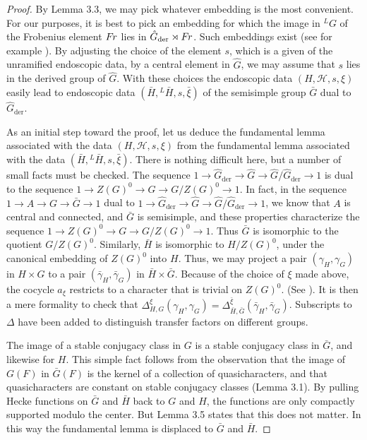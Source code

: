 \documentclass{amsart}
\newcommand\Fr{\text{$F\hskip-.1em r$}}
\newcommand\der{{\text{der}}}
\begin{document}
\begin{proof}
By Lemma 3.3, we may pick whatever embedding is the most
convenient.  For our purposes, it is best to pick an embedding
for which the image in ${}^L\!G$ of the Frobenius element $\Fr$
lies in $\hat G_\der\rtimes\Fr$.  Such embeddings
exist (see for example \cite{H2,6.1}).  By adjusting the
choice of the element $s$, which is
a given of the unramified endoscopic data, 
by a central element in $\hat G$,
we may assume that $s$ lies in the derived group of $\hat G$.
With these choices the endoscopic data $(H,{\mathcal H},s,\xi)$ easily
lead to endoscopic data $(\bar H,{}^L\!\bar H,s,\bar\xi)$
of the semisimple group $\bar G$ dual to $\hat G_\der$.

As an initial step toward the proof, let us deduce the fundamental
lemma associated with the data  $(H,{\mathcal H},s,\xi)$
from the fundamental lemma associated with the data
$(\bar H,{}^L\!\bar H,s,\bar\xi)$.
There is nothing difficult here, but a number of small facts
must be checked.  The sequence $1\to \hat G_\der\to\hat G
\to \hat G/\hat G_\der\to 1$ is dual to the sequence
$1\to Z(G)^0 \to G \to G/Z(G)^0\to 1$.  In fact, in the
sequence $1\to A\to G\to \bar G\to 1$ dual to 
$1\to  \hat G_\der\to\hat G\to\hat G/\hat G_\der\to 1$,
we know that 
$A$ is central and connected, and $\bar G$ is semisimple, and these properties
characterize the sequence $1\to Z(G)^0 \to G \to G/Z(G)^0\to 1$.
Thus $\bar G$ is isomorphic to the quotient $G/Z(G)^0$.
Similarly, $\bar H$ is isomorphic to $H/Z(G)^0$, under the canonical
embedding of $Z(G)^0$ into $H$.  Thus, we may project a pair $(\gamma_H,\gamma_G)$
in $H\times G$ to a pair $(\bar \gamma_H,\bar \gamma_G)$ in $\bar H\times
\bar G$.  Because of the choice of $\xi$ made above, the cocycle
$a_\xi$ restricts to a character that is trivial on $Z(G)^0$.
(See \cite{H2,11}).  It is then a mere formality to check that
$\Delta^\xi_{H,G}(\gamma_H,\gamma_G) = \Delta^{\bar \xi}
_{\bar H,\bar G}(\bar \gamma_H,\bar \gamma_G)$.  Subscripts
to $\Delta$ have been added to distinguish transfer factors on
different groups.

The image of a stable conjugacy class in $G$ is a stable conjugacy
class in $\bar G$, and  likewise for $H$.  This simple fact follows
from the observation that the image of $G(F)$ in $\bar G(F)$ is
the kernel of a collection of quasicharacters, and that quasicharacters
are constant on stable conjugacy classes (Lemma 3.1).  By pulling
Hecke functions on $\bar G$ and $\bar H$ back to $G$ and $H$, the
functions are only compactly supported modulo the center. 
But Lemma 3.5 states
that this does not matter.  In this way the fundamental lemma
is displaced to $\bar G$ and $\bar H$.


\end{proof}
\end{document}
